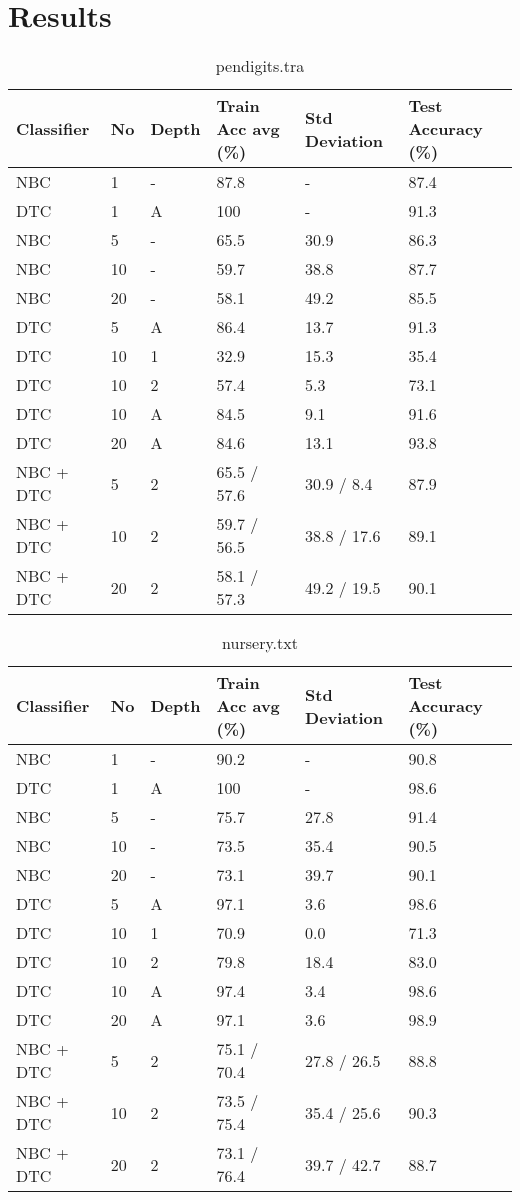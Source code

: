 \chapter{Results}
\label{ch:results}
\begin{table}[h]
	\centering
	\begin{tabular}[h]{l|l|l|l|l|l}
		Classifier & No & Depth & Train Acc avg (\%) & Std Deviation & Test Accuracy (\%)\\
		\hline
		NBC       & 1  & - & 87.8 & - & 87.4 \\
		DTC       & 1  & A & 100  & - & 91.3 \\
		NBC       & 5  & - & 65.5 & 30.9 & 86.3 \\
		NBC       & 10 & - & 59.7 & 38.8 & 87.7 \\
		NBC       & 20 & - & 58.1 & 49.2 & 85.5 \\
		DTC       & 5  & A & 86.4 & 13.7 & 91.3 \\
		DTC       & 10 & 1 & 32.9 & 15.3 & 35.4 \\
		DTC       & 10 & 2 & 57.4 & 5.3 & 73.1 \\
		DTC       & 10 & A & 84.5 & 9.1 & 91.6 \\
		DTC       & 20 & A & 84.6 & 13.1 & 93.8 \\
		NBC + DTC & 5  & 2 & 65.5 / 57.6 & 30.9 / 8.4 & 87.9 \\
		NBC + DTC & 10 & 2 & 59.7 / 56.5 & 38.8 / 17.6 & 89.1 \\
		NBC + DTC & 20 & 2 & 58.1 / 57.3 & 49.2 / 19.5 & 90.1 \\
	\end{tabular}
	\caption{pendigits.tra}
\end{table}

\begin{table}[h]
	\centering
	\begin{tabular}[h]{l|l|l|l|l|l}
		Classifier & No & Depth & Train Acc avg (\%) & Std Deviation & Test Accuracy (\%)\\
		\hline
		NBC       & 1  & - & 90.2 & - & 90.8 \\
		DTC       & 1  & A & 100 & - &  98.6 \\
		NBC       & 5  & - & 75.7 & 27.8 & 91.4 \\
		NBC       & 10 & - & 73.5 & 35.4 & 90.5 \\
		NBC       & 20 & - & 73.1 & 39.7 & 90.1 \\
		DTC       & 5  & A & 97.1 & 3.6 & 98.6 \\
		DTC       & 10 & 1 & 70.9 & 0.0 & 71.3 \\
		DTC       & 10 & 2 & 79.8 & 18.4 & 83.0 \\
		DTC       & 10 & A & 97.4 & 3.4 & 98.6 \\
		DTC       & 20 & A & 97.1 & 3.6 & 98.9 \\
		NBC + DTC & 5  & 2 & 75.1 / 70.4 & 27.8 / 26.5 & 88.8 \\
		NBC + DTC & 10 & 2 & 73.5 / 75.4 & 35.4 / 25.6 & 90.3 \\
		NBC + DTC & 20 & 2 & 73.1 / 76.4 & 39.7 / 42.7 & 88.7 \\
	\end{tabular}
	\caption{nursery.txt}
\end{table}

